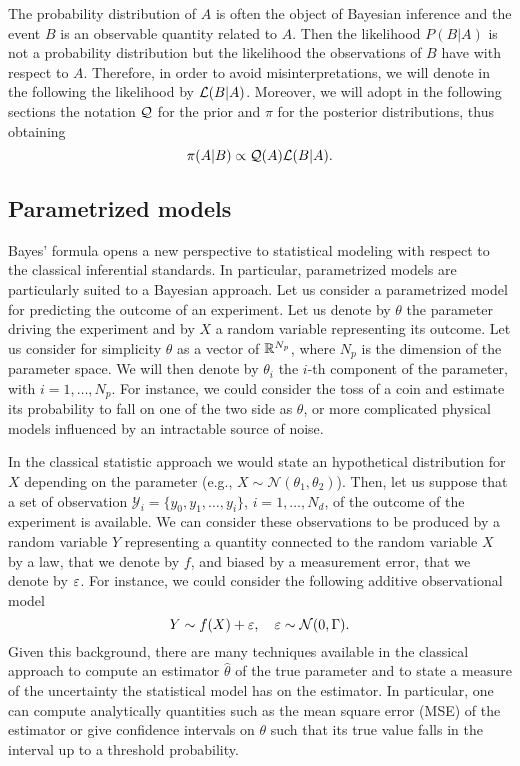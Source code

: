 The probability distribution of $A$ is often the object of Bayesian inference and the event $B$ is an observable quantity related to $A$. Then the likelihood $P(B|A)$ is not a probability distribution but the likelihood the observations of $B$ have with respect to $A$. Therefore, in order to avoid misinterpretations, we will denote in the following the likelihood by $\mathcal{L}(B|A)$. Moreover, we will adopt in the following sections the notation $\mathcal{Q}$ for the prior and $\pi$ for the posterior distributions, thus obtaining
\begin{equation}
	\pi(A|B) \propto \mathcal{Q}(A) \mathcal{L}(B|A).
\end{equation}

\subsection{Parametrized models}
Bayes' formula opens a new perspective to statistical modeling with respect to the classical inferential standards. In particular, parametrized models are particularly suited to a Bayesian approach. Let us consider a parametrized model for predicting the outcome of an experiment. Let us denote by $\theta$ the parameter driving the experiment and by $X$ a random variable representing its outcome. Let us consider for simplicity $\theta$ as a vector of $\mathbb{R}^{N_p}$, where $N_p$ is the dimension of the parameter space. We will then denote by $\theta_i$ the $i$-th component of the parameter, with $i = 1, \ldots, N_p$. For instance, we could consider the toss of a coin and estimate its probability to fall on one of the two side as $\theta$, or more complicated physical models influenced by an intractable source of noise.

In the classical statistic approach we would state an hypothetical distribution for $X$ depending on the parameter (e.g., $X \sim \mathcal{N}(\theta_1, \theta_2)$). Then, let us suppose that a set of observation $\mathcal{Y}_i = \{y_0, y_1, \ldots, y_i\}$, $i = 1, \ldots, N_d$, of the outcome of the experiment is available. We can consider these observations to be produced by a random variable $Y$ representing a quantity connected to the random variable $X$ by a law, that we denote by $f$, and biased by a measurement error, that we denote by $\varepsilon$. For instance, we could consider the following additive observational model 
\begin{equation}\label{eq:GaussianNoise}
	Y \sim f(X) + \varepsilon, \quad \varepsilon \sim \mathcal{N}(0, \Gamma).
\end{equation}
Given this background, there are many techniques available in the classical approach to compute an estimator $\hat \theta$ of the true parameter and to state a measure of the uncertainty the statistical model has on the estimator. In particular, one can compute analytically quantities such as the mean square error (MSE) of the estimator or give confidence intervals on $\theta$ such that its true value falls in the interval up to a threshold probability.


